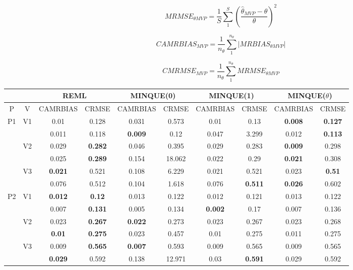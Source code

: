 \documentclass[12pt,a4paper]{article}
\begin{document}
\[
MRMSE_{\theta MVP}=\frac{1}{S}\sum_1^S\left(\frac{\hat{\theta}_{MVP}-\theta}{\theta}\right)^2
\]

\[
CAMRBIAS_{MVP}=\frac{1}{n_{\theta}}\sum_1^{n_{\theta}}|MRBIAS_{\theta MVP}|
\]

\[
CMRMSE_{MVP}=\frac{1}{n_{\theta}}\sum_1^{n_{\theta}}MRMSE_{\theta MVP}
\]

\begin{sidewaystable}[ht]
\centering
{\footnotesize
\begin{tabular}{cc|cc|cc|cc|cc|}
   & & \multicolumn{2}{c|}{REML}&\multicolumn{2}{c|}{MINQUE(0)}&\multicolumn{2}{c|}{MINQUE(1)}&\multicolumn{2}{c|}{MINQUE($\theta$)}\\ \hline
P & V & CAMRBIAS & CRMSE & CAMRBIAS & CRMSE & CAMRBIAS & CRMSE & CAMRBIAS & CRMSE \\ 
  \hline
\multirow{6}{*}{P1} & \multirow{2}{*}{V1} & 0.01 & 0.128 & 0.031 & 0.573 & 0.01 & 0.13 & \textbf{0.008} & \textbf{0.127} \\ 
   &  & 0.011 & 0.118 & \textbf{0.009} & 0.12 & 0.047 & 3.299 & 0.012 & \textbf{0.113} \\ 
   & \multirow{2}{*}{V2} & 0.029 & \textbf{0.282} & 0.046 & 0.395 & 0.029 & 0.283 & \textbf{0.009} & 0.298 \\ 
   &  & 0.025 & \textbf{0.289} & 0.154 & 18.062 & 0.022 & 0.29 & \textbf{0.021} & 0.308 \\ 
   & \multirow{2}{*}{V3} & \textbf{0.021} & 0.521 & 0.108 & 6.229 & 0.021 & 0.521 & 0.023 & \textbf{0.51} \\ 
   &  & 0.076 & 0.512 & 0.104 & 1.618 & 0.076 & \textbf{0.511} & \textbf{0.026} & 0.602 \\ 
   \hline \hline\multirow{6}{*}{P2} & \multirow{2}{*}{V1} & \textbf{0.012} & \textbf{0.12} & 0.013 & 0.122 & 0.012 & 0.121 & 0.013 & 0.122 \\ 
   &  & 0.007 & \textbf{0.131} & 0.005 & 0.134 & \textbf{0.002} & 0.17 & 0.007 & 0.136 \\ 
   & \multirow{2}{*}{V2} & 0.023 & \textbf{0.267} & \textbf{0.022} & 0.273 & 0.023 & 0.267 & 0.023 & 0.268 \\ 
   &  & \textbf{0.01} & \textbf{0.275} & 0.023 & 0.457 & 0.01 & 0.275 & 0.011 & 0.275 \\ 
   & \multirow{2}{*}{V3} & 0.009 & \textbf{0.565} & \textbf{0.007} & 0.593 & 0.009 & 0.565 & 0.009 & 0.565 \\ 
   &  & \textbf{0.029} & 0.592 & 0.138 & 12.971 & 0.03 & \textbf{0.591} & 0.029 & 0.592 \\ 

\end{tabular}}
\end{sidewaystable}
\end{document}
